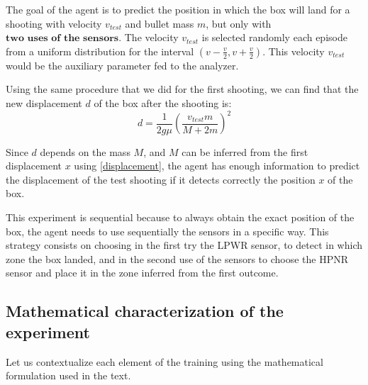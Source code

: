 \documentclass[11pt,a4paper,twoside]{report}
\newcommand{\+}{\textnormal{+} }
\theoremstyle{definition}
\numberwithin{equation}{chapter}
\begin{document}
The goal of the agent is to predict the position in which the box will
land for a shooting with velocity $v_{test}$ and bullet mass $m$, but only with
$\textbf{two uses of the sensors}$. The velocity $v_{test}$ is selected randomly
each episode from a uniform distribution for the interval $(v-\frac{v}{2},
v+\frac{v}{2})$. This velocity $v_{test}$ would be the auxiliary parameter fed
to the analyzer. 

Using the same procedure that we did for the first shooting, we can find that
the new displacement $d$ of the box after the shooting is:
\begin{equation}
  d=\frac{1}{2g\mu}\left(\frac{v_{test}m}{M+2m} \right)^2
\end{equation}

Since $d$ depends on the mass $M$, and $M$ can be inferred from the first
displacement $x$ using \eqref{displacement}, the agent has enough information
to predict the displacement of the test shooting if it detects correctly the 
position $x$ of the box.

This experiment is sequential because to always obtain the exact position of the
box, the agent needs to use sequentially the sensors in a specific way. This
strategy consists on choosing in the first try the LPWR sensor, to detect in
which zone the box landed, and in the second use of the sensors to choose the
HPNR sensor and place it in the zone inferred from the first outcome.

\subsection{Mathematical characterization of the experiment}

Let us contextualize each element of the training using the mathematical
formulation used in the text.
\end{document}

